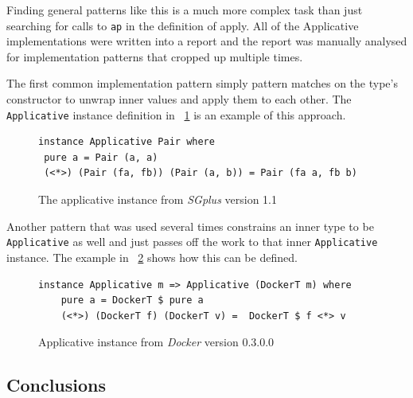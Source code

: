 Finding general patterns like this is a much more complex task than just searching for calls to \texttt{ap} in the definition of apply. All of the Applicative implementations were written into a report and the report was manually analysed for implementation patterns that cropped up multiple times. 

The first common implementation pattern simply pattern matches on the type's constructor to unwrap inner values and apply them to each other. The \texttt{Applicative} instance definition in \DIFdelbegin {}\DIFdelend \DIFaddbegin {}\DIFaddend ~\ref{sgplusPair} is an example of this approach. 

\begin{figure}[t]
\begin{lstlisting}
instance Applicative Pair where
 pure a = Pair (a, a)
 (<*>) (Pair (fa, fb)) (Pair (a, b)) = Pair (fa a, fb b)
\end{lstlisting}
\caption{The applicative instance from \textit{SGplus} version 1.1}
\label{sgplusPair}
\end{figure}

Another pattern that was used several times constrains an inner type to be \texttt{Applicative} as well and just passes off the work to that inner \texttt{Applicative} instance. The example in \DIFdelbegin {}\DIFdelend \DIFaddbegin {}\DIFaddend ~\ref{dockerApp} shows how this can be defined.

\begin{figure}[t]
\begin{lstlisting}
instance Applicative m => Applicative (DockerT m) where
    pure a = DockerT $ pure a
    (<*>) (DockerT f) (DockerT v) =  DockerT $ f <*> v
\end{lstlisting}
\caption{Applicative instance from \textit{Docker} version 0.3.0.0}
\label{dockerApp}
\end{figure}

\DIFaddbegin \subsection{Conclusions}

\texttt{} 

